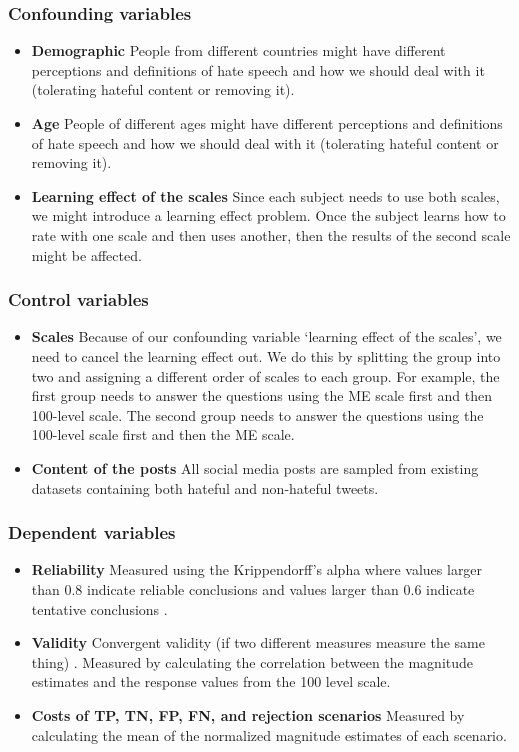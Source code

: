 \documentclass[a4paper]{article}
\begin{document}
\subsubsection{Confounding variables}
\begin{itemize}
    \item \textbf{Demographic} People from different countries might have different perceptions and definitions of hate speech and how we should deal with it (tolerating hateful content or removing it).
    \item \textbf{Age} People of different ages might have different perceptions and definitions of hate speech and how we should deal with it (tolerating hateful content or removing it).
    \item \textbf{Learning effect of the scales} Since each subject needs to use both scales, we might introduce a learning effect problem. Once the subject learns how to rate with one scale and then uses another, then the results of the second scale might be affected.
\end{itemize}

\subsubsection{Control variables}
\begin{itemize}
    \item \textbf{Scales} Because of our confounding variable ‘learning effect of the scales', we need to cancel the learning effect out. We do this by splitting the group into two and assigning a different order of scales to each group. For example, the first group needs to answer the questions using the ME scale first and then 100-level scale. The second group needs to answer the questions using the 100-level scale first and then the ME scale.
    \item \textbf{Content of the posts} All social media posts are sampled from existing datasets containing both hateful and non-hateful tweets.
\end{itemize}

\subsubsection{Dependent variables}
\begin{itemize}
    \item \textbf{Reliability} Measured using the Krippendorff's alpha where values larger than 0.8 indicate reliable conclusions and values larger than 0.6 indicate tentative conclusions \cite{krippendorff2004reliability}.
    \item \textbf{Validity} Convergent validity (if two different measures measure the same thing) \cite{fitzner2007reliability}. Measured by calculating the correlation between the magnitude estimates and the response values from the 100 level scale.
    \item \textbf{Costs of TP, TN, FP, FN, and rejection scenarios} Measured by calculating the mean of the normalized magnitude estimates of each scenario.
\end{itemize}
\end{document}
